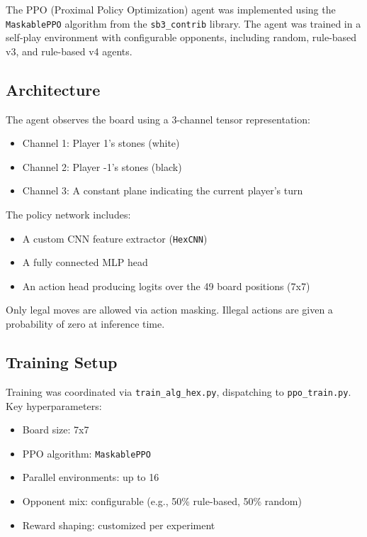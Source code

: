 \documentclass[conference]{IEEEtran}
\begin{document}
The PPO (Proximal Policy Optimization) agent was implemented using the \texttt{MaskablePPO} algorithm from the \texttt{sb3\_contrib} library. The agent was trained in a self-play environment with configurable opponents, including random, rule-based v3, and rule-based v4 agents.

\subsection{Architecture}

The agent observes the board using a 3-channel tensor representation:
\begin{itemize}
    \item Channel 1: Player 1's stones (white)
    \item Channel 2: Player -1's stones (black)
    \item Channel 3: A constant plane indicating the current player's turn
\end{itemize}

The policy network includes:
\begin{itemize}
    \item A custom CNN feature extractor (\texttt{HexCNN})
    \item A fully connected MLP head
    \item An action head producing logits over the 49 board positions (7x7)
\end{itemize}

Only legal moves are allowed via action masking. Illegal actions are given a probability of zero at inference time.

\subsection{Training Setup}

Training was coordinated via \texttt{train\_alg\_hex.py}, dispatching to \texttt{ppo\_train.py}. Key hyperparameters:

\begin{itemize}
    \item Board size: 7x7
    \item PPO algorithm: \texttt{MaskablePPO}
    \item Parallel environments: up to 16
    \item Opponent mix: configurable (e.g., 50\% rule-based, 50\% random)
    \item Reward shaping: customized per experiment
\end{itemize}
\end{document}
